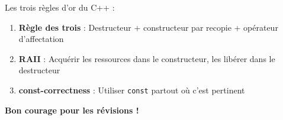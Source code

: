 \documentclass[12pt,a4paper]{article}
\begin{document}
\begin{regle}
Les trois règles d'or du C++ :
\begin{enumerate}
    \item \textbf{Règle des trois} : Destructeur + constructeur par recopie + opérateur d'affectation
    \item \textbf{RAII} : Acquérir les ressources dans le constructeur, les libérer dans le destructeur
    \item \textbf{const-correctness} : Utiliser \texttt{const} partout où c'est pertinent
\end{enumerate}
\end{regle}

\begin{center}
\textbf{Bon courage pour les révisions !}
\end{center}
\end{document}
